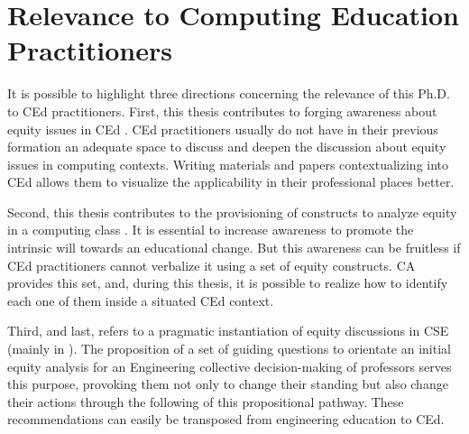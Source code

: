 \section{Relevance to Computing Education Practitioners}
\label{intro-sec:rel-computing}

It is possible to highlight three directions concerning the relevance of this \gls{Ph.D.} to \gls{CEd} practitioners. First, this thesis contributes to forging awareness about equity issues in \gls{CEd} \cite{bispojr:2022-educomp}. \gls{CEd} practitioners usually do not have in their previous formation an adequate space to discuss and deepen the discussion about equity issues in computing contexts. Writing materials and papers contextualizing into \gls{CEd} allows them to visualize the applicability in their professional places better.

Second, this thesis contributes to the provisioning of constructs to analyze equity in a computing class \cite{bispojr:2024-nmp}. It is essential to increase awareness to promote the intrinsic will towards an educational change. But this awareness can be fruitless if \gls{CEd} practitioners cannot verbalize it using a set of equity constructs. \gls{CA} provides this set, and, during this thesis, it is possible to realize how to identify each one of them inside a situated \gls{CEd} context.

Third, and last, refers to a pragmatic instantiation of equity discussions in \gls{CSE} (mainly in \cite{bispojr:2024-online-lab}). The proposition of a set of guiding questions to orientate an initial equity analysis for an Engineering collective decision-making of professors serves this purpose, provoking them not only to change their standing but also change their actions through the following of this propositional pathway. These recommendations can easily be transposed from engineering education to \gls{CEd}.
                